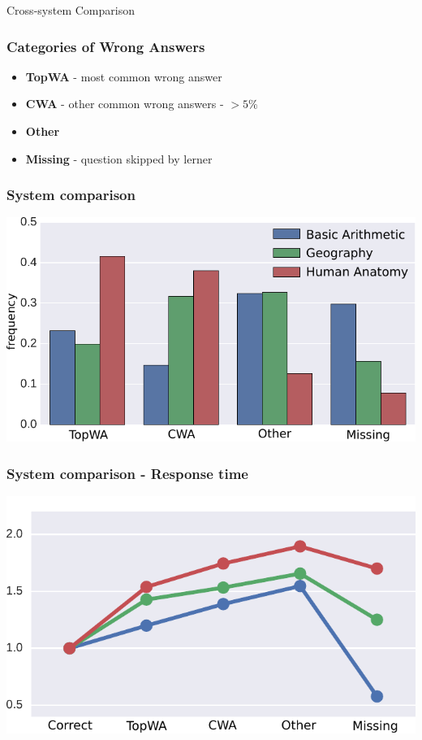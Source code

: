 \documentclass[xcolor=svgnames]{beamer}
\begin{document}



\begin{frame}
    \centering
    \huge Cross-system Comparison
\end{frame}
\begin{frame}
    \frametitle{Categories of Wrong Answers}
    \Large
    \begin{itemize}
        \item \textbf{TopWA} - most common wrong answer
        \item \textbf{CWA} - other common wrong answers - $> 5\%$
        \item \textbf{Other}
        \item \textbf{Missing} - question skipped by lerner
    \end{itemize}
\end{frame}
\begin{frame}
    \frametitle{System comparison}
    \centering
    \includegraphics[width=\linewidth]{figures/system-comparison-distribution}
\end{frame}
\begin{frame}
    \frametitle{System comparison - Response time}
    \centering
    \includegraphics[width=0.8\linewidth]{figures/system-comparison-response-time}
\end{frame}
\end{document}
